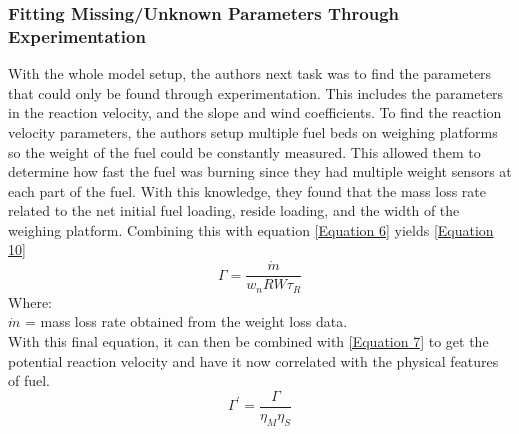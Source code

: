 \documentclass{article}
\begin{document}
 \subsubsection{Fitting Missing/Unknown Parameters Through Experimentation}
 \indent With the whole model setup, the authors next task was to find the parameters that could only be found through experimentation. This includes the parameters in the reaction velocity, and the slope and wind coefficients. To find the reaction velocity parameters, the authors setup multiple fuel beds on weighing platforms so the weight of the fuel could be constantly measured. This allowed them to determine how fast the fuel was burning since they had multiple weight sensors at each part of the fuel. With this knowledge, they found that the mass loss rate related to the net initial fuel loading, reside loading, and the width of the weighing platform. Combining this with equation \ref{Equation 6} yields \ref{Equation 10}
 \begin{equation}
 	\label{Equation 10}
 	\Gamma = \frac {\dot m } {w_n RW \tau _ R} 
 \end{equation}
 Where: \\
 $\dot m$ = mass loss rate obtained from the weight loss data. \\
 \indent With this final equation, it can then be combined with \ref{Equation 7} to get the potential reaction velocity and have it now correlated with the physical features of fuel. 
 \begin{equation}
 	\label{Equation 11}
 	\Gamma ^ {'} = \frac {\Gamma} {\eta _ M \eta _ S}
 \end{equation}
 
\end{document}
